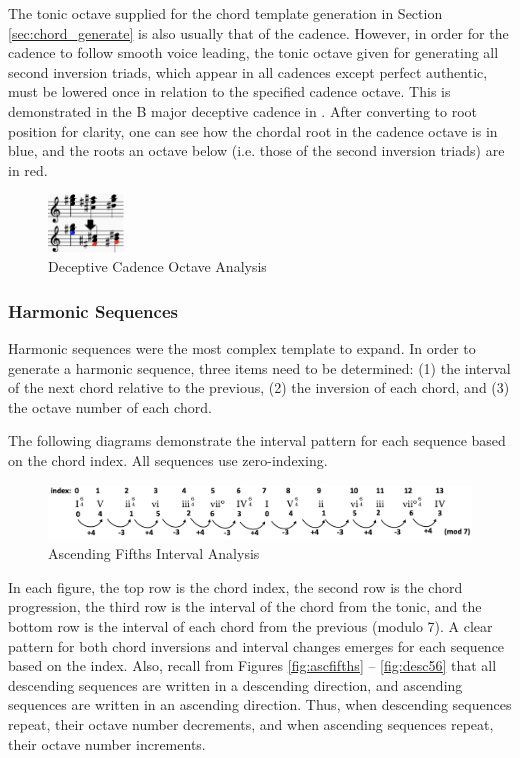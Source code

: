 \documentclass{article}
\begin{document}
The tonic octave supplied for the chord template generation in Section \ref{sec:chord_generate} is also usually that of the cadence. However, in order for the cadence to follow smooth voice leading, the tonic octave given for generating all second inversion triads, which appear in all cadences except perfect authentic, must be lowered once in relation to the specified cadence octave. This is demonstrated in the B major deceptive cadence in . After converting to root position for clarity, one can see how the chordal root in the cadence octave is in blue, and the roots an octave below (i.e. those of the second inversion triads) are in red.

\begin{figure}[h!]
\centering
\includegraphics[width=0.18\textwidth]{images/cadence_octaves}
  \caption{Deceptive Cadence Octave Analysis}\label{fig:cadence_octaves}
\end{figure}


\subsubsection{Harmonic Sequences}
Harmonic sequences were the most complex template to expand. In order to generate a harmonic sequence, three items need to be determined: (1) the interval of the next chord relative to the previous, (2) the inversion of each chord, and (3) the octave number of each chord.

The following diagrams demonstrate the interval pattern for each sequence based on the chord index. All sequences use zero-indexing. 

\begin{figure}[h!]
\centering
\includegraphics[width=\textwidth]{images/asc_fifths_intervals}
  \caption{Ascending Fifths Interval Analysis}
\end{figure}

In each figure, the top row is the chord index, the second row is the chord progression, the third row is the interval of the chord from the tonic, and the bottom row is the interval of each chord from the previous (modulo 7). A clear pattern for both chord inversions and interval changes emerges for each sequence based on the index. Also, recall from Figures \ref{fig:ascfifths} -- \ref{fig:desc56} that all descending sequences are written in a descending direction, and ascending sequences are written in an ascending direction. Thus, when descending sequences repeat, their octave number decrements, and when ascending sequences repeat, their octave number increments. 
\end{document}
